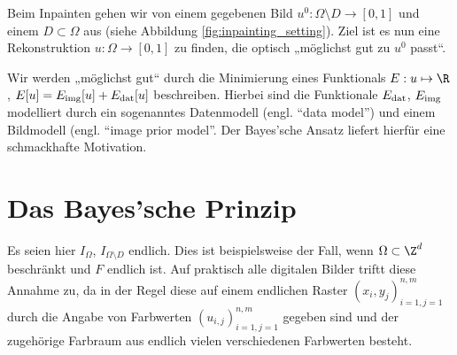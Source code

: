 \documentclass{mythesis}
\begin{document}
Beim Inpainten gehen wir von einem gegebenen Bild $u^0: \Omega \setminus D \to [0,1]$ und einem 
$D \subset \Omega$ aus (siehe Abbildung \ref{fig:inpainting_setting}). Ziel ist es nun eine Rekonstruktion $u: \Omega \to [0,1]$ zu finden, die optisch „möglichst gut zu $u^0$ passt“.

Wir werden „möglichst gut“ durch die Minimierung eines Funktionals $E: u \mapsto \R$,
\begin{math}
    E[u] = E_{\mathrm{img}}[u] + E_{\mathrm{dat}}[u]
\end{math}
beschreiben.
Hierbei sind die Funktionale $E_{\mathrm{dat}}$, $E_{\mathrm{img}}$ modelliert durch ein sogenanntes Datenmodell (engl. “data model”) und einem Bildmodell (engl. “image prior model”.
Der Bayes'sche Ansatz liefert hierfür eine schmackhafte Motivation.


\section{Das Bayes'sche Prinzip}


Es seien hier $I_\Omega$, $I_{\Omega \setminus D}$ endlich.
Dies ist beispielsweise der Fall, wenn $\Omega \subset \Z^d$ beschränkt und $F$ endlich ist.
Auf praktisch alle digitalen Bilder triftt diese Annahme zu, da in der Regel diese auf einem endlichen Raster $(x_i, y_j)_{i=1,j=1}^{n,m}$ durch die Angabe von Farbwerten $(u_{i,j})_{i=1,j=1}^{n,m}$ gegeben sind und der zugehörige Farbraum aus endlich vielen verschiedenen Farbwerten besteht.
\end{document}
